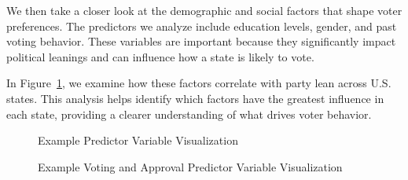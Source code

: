 \documentclass[
  letterpaper,
  DIV=11,
  numbers=noendperiod]{scrartcl}
\begin{document}
We then take a closer look at the demographic and social factors that
shape voter preferences. The predictors we analyze include education
levels, gender, and past voting behavior. These variables are important
because they significantly impact political leanings and can influence
how a state is likely to vote.

In Figure~\ref{fig-predictors-party-pct}, we examine how these factors
correlate with party lean across U.S. states. This analysis helps
identify which factors have the greatest influence in each state,
providing a clearer understanding of what drives voter behavior.

\begin{figure}


\caption{\label{fig-predictors-party-pct}Example Predictor Variable
Visualization}

\end{figure}%

\begin{figure}


\caption{\label{fig-predictors-party-pct-2}Example Voting and Approval
Predictor Variable Visualization}

\end{figure}%
\end{document}
